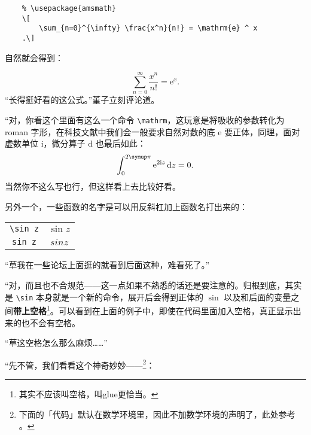 \begin{lstlisting}
    % \usepackage{amsmath}
    \[
        \sum_{n=0}^{\infty} \frac{x^n}{n!} = \mathrm{e} ^ x
    .\]
\end{lstlisting}

自然就会得到：



\[
    \sum_{n=0}^{\infty} \frac{x^n}{n!} = \mathrm{e} ^ x
    .\]
“长得挺好看的这公式。”堇子立刻评论道。

“对，你看这个里面有这么一个命令 \verb"\mathrm"，这玩意是将吸收的参数转化为 roman 字形，在科技文献中我们会一般要求自然对数的底 $\mathrm{e}$ 要正体，同理，面对虚数单位 $\mathrm{i}$，微分算子 $\mathrm{d}$ 也最后如此：
\[
    \int_0^{2\symup\pi } \mathrm{e} ^ {2 \mathrm{i} z } \,\mathrm{d}z = 0
    .\]
当然你不这么写也行，但这样看上去比较好看。

另外一个，一些函数的名字是可以用反斜杠加上函数名打出来的：

\begin{center}
    \begin{tabular}{cc}
        \verb"\sin z" & $\sin z$ \\
        \verb"sin z"  & $sin z$  \\
    \end{tabular}
\end{center}

“草我在一些论坛上面逛的就看到后面这种，难看死了。”

“对，而且也不合规范——这一点如果不熟悉的话还是要注意的。归根到底，其实是 \verb"\sin" 本身就是一个新的命令，展开后会得到正体的 $\sin $ 以及和后面的变量之间\textbf{带上空格}\footnote{其实不应该叫空格，叫glue更恰当。}。可以看到在上面的例子中，即使在代码里面加入空格，真正显示出来的也不会有空格。

“草这空格怎么那么麻烦……”

“先不管，我们看看这个神奇妙妙——\footnote{下面的「代码」默认在数学环境里，因此不加数学环境的声明了，此处参考 \textcite[Symbols defined by unicode-math]{WillRobertson} 。}：

